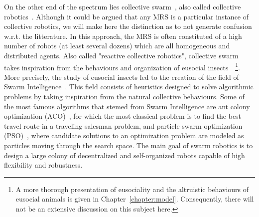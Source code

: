     On the other end of the spectrum lies collective swarm~\parencite{Beni2005}, also called collective robotics~\parencite{Kube1993, Parker2008}. Although it could be argued that any MRS is a particular instance of collective robotics, we will make here the distinction as to not generate confusion w.r.t. the litterature. In this approach, the MRS is often constituted of a high number of robots (at least several dozens) which are all homogeneous and distributed agents. Also called "reactive collective robotics", collective swarm takes inspiration from the behaviours and organization of eusocial insects~\parencite{Wilson1998, Werfel2014}~\footnote{A more thorough presentation of eusociality and the altruistic behaviours of eusocial animals is given in Chapter~\ref{chapter:model}. Consequently, there will not be an extensive discussion on this subject here.}. More precisely, the study of eusocial insects led to the creation of the field of Swarm Intelligence~\parencite{Bonabeau1999, Zoghby2013}. This field consists of heuristics designed to solve algorithmic problems by taking inspiration from the natural collective behaviours. Some of the most famous algorithms that stemed from Swarm Intelligence are ant colony optimization (ACO)~\parencite{Dorigo2004a}, for which the most classical problem is to find the best travel route in a traveling salesman problem, and particle swarm optimization (PSO)~\parencite{Kennedy1995}, where candidate solutions to an optimization problem are modeled as particles moving through the search space. The main goal of swarm robotics is to design a large colony of decentralized and self-organized robots capable of high flexibility and robustness.

